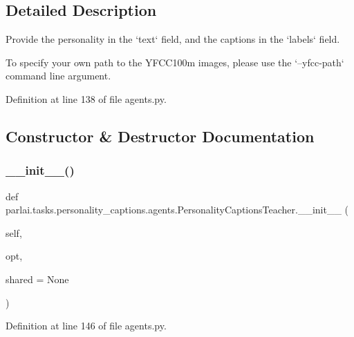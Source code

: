 \subsection{Detailed Description}
\begin{DoxyVerb}Provide the personality in the `text` field, and the captions in the `labels` field.

To specify your own path to the YFCC100m images, please use the `--yfcc-path`
command line argument.
\end{DoxyVerb}
 

Definition at line 138 of file agents.\+py.



\subsection{Constructor \& Destructor Documentation}
\mbox{\label{classparlai_1_1tasks_1_1personality__captions_1_1agents_1_1PersonalityCaptionsTeacher_a629424710e209cb59e97404a313a97a8}} 
\subsubsection{\texorpdfstring{\+\_\+\+\_\+init\+\_\+\+\_\+()}{\_\_init\_\_()}}
{\footnotesize\ttfamily def parlai.\+tasks.\+personality\+\_\+captions.\+agents.\+Personality\+Captions\+Teacher.\+\_\+\+\_\+init\+\_\+\+\_\+ (\begin{DoxyParamCaption}\item[{}]{self,  }\item[{}]{opt,  }\item[{}]{shared = {\ttfamily None} }\end{DoxyParamCaption})}



Definition at line 146 of file agents.\+py.


